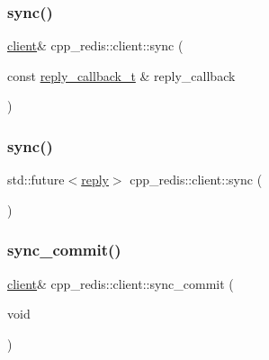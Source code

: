 \mbox{\label{classcpp__redis_1_1client_a47d8402e7fa9f7b8a021356baf83fd1f}} 
\subsubsection{\texorpdfstring{sync()}{sync()}\hspace{0.1cm}{\footnotesize\ttfamily [1/2]}}
{\footnotesize\ttfamily \hyperlink{classcpp__redis_1_1client}{client}\& cpp\+\_\+redis\+::client\+::sync (\begin{DoxyParamCaption}\item[{const \hyperlink{classcpp__redis_1_1client_a061a1140d36d2eaeda82b09a0bb3f9f2}{reply\+\_\+callback\+\_\+t} \&}]{reply\+\_\+callback }\end{DoxyParamCaption})}

\mbox{\label{classcpp__redis_1_1client_a09c4ffbad45c8ee8a171333ed81c8d43}} 
\subsubsection{\texorpdfstring{sync()}{sync()}\hspace{0.1cm}{\footnotesize\ttfamily [2/2]}}
{\footnotesize\ttfamily std\+::future$<$\hyperlink{classcpp__redis_1_1reply}{reply}$>$ cpp\+\_\+redis\+::client\+::sync (\begin{DoxyParamCaption}{ }\end{DoxyParamCaption})}

\mbox{\label{classcpp__redis_1_1client_a23c8a27ee691c52713411ae91e1391fb}} 
\subsubsection{\texorpdfstring{sync\+\_\+commit()}{sync\_commit()}\hspace{0.1cm}{\footnotesize\ttfamily [1/2]}}
{\footnotesize\ttfamily \hyperlink{classcpp__redis_1_1client}{client}\& cpp\+\_\+redis\+::client\+::sync\+\_\+commit (\begin{DoxyParamCaption}\item[{void}]{ }\end{DoxyParamCaption})}

